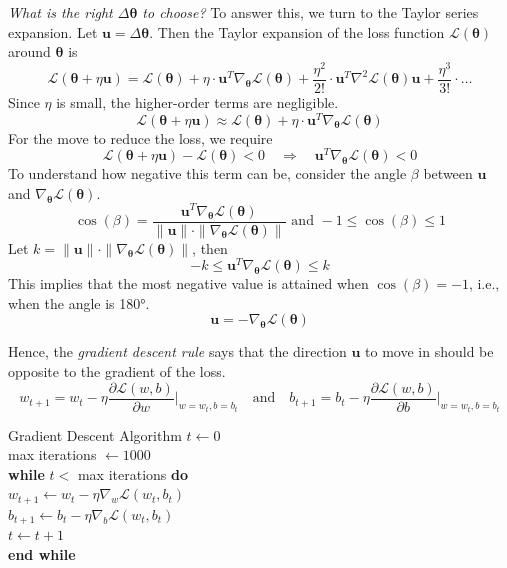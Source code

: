 \textit{What is the right \( \Delta \boldsymbol{\theta} \) to choose?} \cite{khapra2018deeplearning}
To answer this, we turn to the Taylor series expansion. Let \( \boldsymbol{u} = \Delta \boldsymbol{\theta} \). Then the Taylor expansion of the loss function \( \mathcal{L}(\boldsymbol{\theta}) \) around \( \boldsymbol{\theta} \) is 
\[
\mathcal{L}(\boldsymbol{\theta} + \eta \boldsymbol{u}) = \mathcal{L}(\boldsymbol{\theta}) + \eta \cdot \boldsymbol{u}^T \nabla_{\boldsymbol{\theta}} \mathcal{L}(\boldsymbol{\theta}) + \frac{\eta^2}{2!} \cdot \boldsymbol{u}^T \nabla^2 \mathcal{L}(\boldsymbol{\theta}) \boldsymbol{u} + \frac{\eta^3}{3!} \cdot \ldots
\]
Since \( \eta \) is small, the higher-order terms are negligible.
\[
\mathcal{L}(\boldsymbol{\theta} + \eta \boldsymbol{u}) \approx \mathcal{L}(\boldsymbol{\theta}) + \eta \cdot \boldsymbol{u}^T \nabla_{\boldsymbol{\theta}} \mathcal{L}(\boldsymbol{\theta})
\]
For the move to reduce the loss, we require
\[
\mathcal{L}(\boldsymbol{\theta} + \eta \boldsymbol{u}) - \mathcal{L}(\boldsymbol{\theta}) < 0 \quad \Rightarrow \quad \boldsymbol{u}^T \nabla_{\boldsymbol{\theta}} \mathcal{L}(\boldsymbol{\theta}) < 0
\]
To understand how negative this term can be, consider the angle \( \beta \) between \( \boldsymbol{u} \) and \( \nabla_{\boldsymbol{\theta}} \mathcal{L}(\boldsymbol{\theta}) \). 
\[
\cos(\beta) = \frac{\boldsymbol{u}^T \nabla_{\boldsymbol{\theta}} \mathcal{L}(\boldsymbol{\theta})}{\|\boldsymbol{u}\| \cdot \| \nabla_{\boldsymbol{\theta}} \mathcal{L}(\boldsymbol{\theta}) \|} \text{ and } -1 \leq \cos(\beta) \leq 1
\]
Let \( k = \|\boldsymbol{u}\| \cdot \|\nabla_{\boldsymbol{\theta}} \mathcal{L}(\boldsymbol{\theta})\| \), then
\[
-k \leq \boldsymbol{u}^T \nabla_{\boldsymbol{\theta}} \mathcal{L}(\boldsymbol{\theta}) \leq k
\]
This implies that the most negative value is attained when \( \cos(\beta) = -1 \), i.e., when the angle is 180°.
\[
\boldsymbol{u} = -\nabla_{\boldsymbol{\theta}} \mathcal{L}(\boldsymbol{\theta})
\]

Hence, the \textit{gradient descent rule} says that the direction \( \boldsymbol{u} \) to move in should be opposite to the gradient of the loss.
\[
w_{t+1} = w_t - \eta \frac{\partial \mathcal{L}(w, b)}{\partial w}\bigg|_{w = w_t, b = b_t}
\quad \text{and} \quad
b_{t+1} = b_t - \eta \frac{\partial \mathcal{L}(w, b)}{\partial b}\bigg|_{w = w_t, b = b_t}
\]

\begin{algobox}{Gradient Descent Algorithm}
\( t \gets 0 \) \\
max iterations \( \gets 1000 \) \\
\textbf{while} \( t < \) max iterations \textbf{do} \\
\hspace*{1em} \( w_{t+1} \gets w_t - \eta \nabla_w \mathcal{L}(w_t, b_t) \) \\
\hspace*{1em} \( b_{t+1} \gets b_t - \eta \nabla_b \mathcal{L}(w_t, b_t) \) \\
\hspace*{1em} \( t \gets t + 1 \) \\
\textbf{end while}
\end{algobox}

